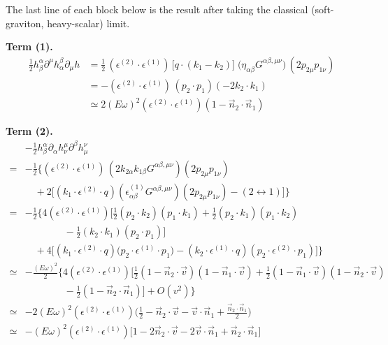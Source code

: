 \documentclass[12pt,a4paper,oneside]{article}
\numberwithin{equation}{section}   %
\begin{document}
The last line of each block below is the result after taking the classical
(soft-graviton, heavy-scalar) limit.

\bigskip
\noindent\textbf{Term (1).}
\begin{align*}
\tfrac12 h_\beta^\alpha \partial^\mu h_\alpha^\beta \partial_\mu h
&= \tfrac12\,(\epsilon^{(2)}\!\cdot\epsilon^{(1)})\,\bigl[q\cdot(k_1-k_2)\bigr]\;
\bigl(\eta_{\alpha\beta}G^{\alpha\beta,\mu\nu}\bigr)\,(2p_{2\mu}p_{1\nu}) \\
&= -(\epsilon^{(2)}\!\cdot\epsilon^{(1)})\,(p_2\!\cdot\!p_1)(-2k_2\!\cdot\!k_1) \\
&\simeq 2(E\omega)^2(\epsilon^{(2)}\!\cdot\epsilon^{(1)})(1-\vec n_2\!\cdot\!\vec n_1)
\end{align*}
 
\bigskip
\noindent\textbf{Term (2).}
\begin{align*}
&-\tfrac12 h_\beta^\alpha \partial_\alpha h_\nu^\mu \partial^\beta h_\mu^\nu\\
={}& -\tfrac12\Big\{(\epsilon^{(2)}\!\cdot\epsilon^{(1)})\,(2k_{2\alpha}k_{1\beta}G^{\alpha\beta,\mu\nu})(2p_{2\mu}p_{1\nu}) \\
&\quad +2\big[(k_1\!\cdot\!\epsilon^{(2)}\!\cdot\! q)(\epsilon^{(1)}_{\alpha\beta}G^{\alpha\beta,\mu\nu})(2p_{2\mu}p_{1\nu})
-(2\leftrightarrow1)\big]\Big\} \\[4pt]
={}& -\tfrac12\Big\{4(\epsilon^{(2)}\!\cdot\epsilon^{(1)})\Big[\tfrac12(p_2\!\cdot\!k_2)(p_1\!\cdot\!k_1)
+\tfrac12(p_2\!\cdot\!k_1)(p_1\!\cdot\!k_2)\\
&\qquad\qquad-\tfrac12(k_2\!\cdot\!k_1)(p_2\!\cdot\!p_1)\Big] \\
&\quad +4\Big[(k_1\!\cdot\!\epsilon^{(2)}\!\cdot\! q)\bigl(p_2\!\cdot\!\epsilon^{(1)}\!\cdot\! p_1\bigr)
-(k_2\!\cdot\!\epsilon^{(1)}\!\cdot\! q)(p_2\!\cdot\!\epsilon^{(2)}\!\cdot\! p_1)\Big]\Big\} \\[4pt]
\simeq{}& -\tfrac{(E\omega)^2}{2}\Big\{4(\epsilon^{(2)}\!\cdot\epsilon^{(1)})
\Big[\tfrac12(1-\vec n_2\!\cdot\!\vec v)(1-\vec n_1\!\cdot\!\vec v)
+\tfrac12(1-\vec n_1\!\cdot\!\vec v)(1-\vec n_2\!\cdot\!\vec v)\\
&\qquad\qquad-\tfrac12(1-\vec n_2\!\cdot\!\vec n_1)\Big] +O(v^2)\Big\} \\[4pt]
\simeq{}& -2(E\omega)^2(\epsilon^{(2)}\!\cdot\epsilon^{(1)})
\Big(\tfrac12-\vec n_2\!\cdot\!\vec v-\vec v\!\cdot\! \vec n_1+\tfrac{\vec n_2\cdot\vec n_1}{2}\Big) \\[4pt]
\simeq{}& -(E\omega)^2(\epsilon^{(2)}\!\cdot\epsilon^{(1)})
\bigl[1-2\vec n_2\!\cdot\!\vec v-2\vec v\!\cdot\! \vec n_1+\vec n_2\!\cdot\!\vec n_1\bigr]
\end{align*}
 
\end{document}
